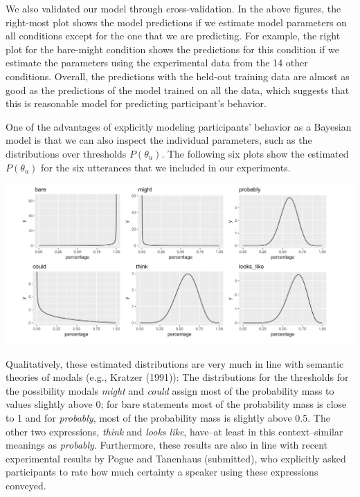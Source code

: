 \documentclass[lucida,biblatex]{sp} %
\begin{document}
We also validated our model through cross-validation. In the above figures, the right-most plot shows the model predictions if we estimate model parameters on all conditions except for the one that we are predicting. For example, the right plot for the bare-might condition shows the predictions for this condition if we estimate the parameters using the experimental data from the 14 other conditions. Overall, the predictions with the held-out training data are almost as good as the predictions of the model trained on all the data, which suggests that this is reasonable model for predicting participant's behavior.

One of the advantages of explicitly modeling participants' behavior as a Bayesian model is that we can also inspect the individual parameters, such as the distributions over thresholds $P(\theta_u)$. The following six plots show the estimated $P(\theta_u)$ for the six utterances that we included in our experiments.

\includegraphics[width=\textwidth]{figures/threshold-distrs.png}

\vspace{2em}

Qualitatively, these estimated distributions are very much in line with semantic theories of modals (e.g., Kratzer (1991)): The  distributions for the thresholds for the possibility  modals \textit{might} and \textit{could} assign most of the probability mass to values slightly above 0; for bare statements most of the probability mass is close to 1 and for \textit{probably}, most of the probability mass is slightly above 0.5. The other two expressions, \textit{think} and \textit{looks like}, have--at least in this context--similar meanings as \textit{probably}. Furthermore, these results are also in line with recent experimental results by Pogue and Tanenhaus (submitted), who explicitly asked participants to rate how much certainty a speaker using these expressions conveyed.
\end{document}

